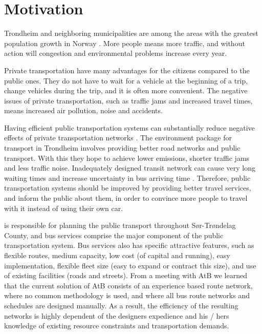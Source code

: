 \section{Motivation}

Trondheim and neighboring municipalities are among the areas with the greatest population growth in Norway \citep{website:miljopakken}. More people means more traffic, and without action will congestion and environmental problems increase every year. 

Private transportation have many advantages for the citizens compared to the public ones. They do not have to wait for a vehicle at the beginning of a trip, change vehicles during the trip, and it is often more convenient. The negative issues of private transportation, such as traffic jams and increased travel times, means increased air pollution, noise and accidents. 

Having efficient public transportation systems can substantially reduce negative effects of private transportation networks 
\citep{kechagiopoulos14} . The environment package \citep{website:miljopakken} for transport in Trondheim involves providing better road networks and public transport. With this they hope to achieve lower emissions, shorter traffic jams and less traffic noise. Inadequately designed transit network can cause very long waiting times and increase uncertainty in bus arriving time \citep{nikolic14}. Therefore, public transportation systems should be improved by providing better travel services, and inform the public about them, in order to convince more people to travel with it instead of using their own car. 

 \citet{website:atb} is responsible for planning the public transport throughout Sør-Trøndelag County, and bus services comprise the major component of the public transportation system. Bus services also has specific attractive features, such as flexible routes, medium capacity, low cost (of capital and running), easy implementation, flexible fleet size (easy to expand or contract this size), and use of existing facilities (roads and streets). From a meeting with AtB we learned that the current solution of AtB consists of an experience based route network, where no common methodology is used, and where all bus route networks and schedules are designed manually. As a result, the efficiency of the resulting networks is highly dependent of the designers expedience and his / hers knowledge of existing resource constraints and transportation demands.

